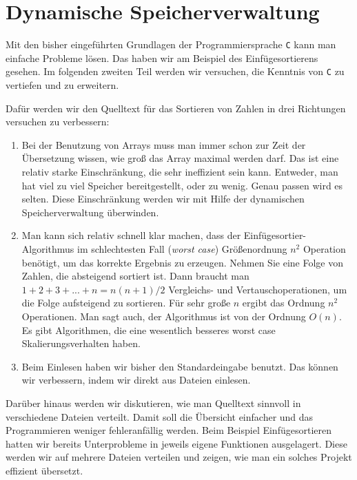 \section{Dynamische Speicherverwaltung}

Mit den bisher eingeführten Grundlagen der Programmiersprache \texttt{C} kann man einfache Probleme lösen.
Das haben wir am Beispiel des Einfügesortierens gesehen.
Im folgenden zweiten Teil werden wir versuchen, die Kenntnis von \texttt{C} zu vertiefen und zu erweitern.

Dafür werden wir den Quelltext für das Sortieren von Zahlen in drei Richtungen versuchen zu verbessern:
\begin{enumerate}
\item Bei der Benutzung von Arrays muss man immer schon zur Zeit der Übersetzung wissen, wie groß das Array maximal werden darf.
  Das ist eine relativ starke Einschränkung, die sehr ineffizient sein kann.
  Entweder, man hat viel zu viel Speicher bereitgestellt, oder zu wenig.
  Genau passen wird es selten.
  Diese Einschränkung werden wir mit Hilfe der dynamischen Speicherverwaltung überwinden.

\item Man kann sich relativ schnell klar machen, dass der Einfügesortier-Algorithmus im schlechtesten Fall (\emph{worst case}) Größenordnung $n^2$ Operation benötigt, um das korrekte Ergebnis zu erzeugen.
  Nehmen Sie eine Folge von Zahlen, die absteigend sortiert ist.
  Dann braucht man $1 + 2 + 3 + ... + n = n(n+1)/2$ Vergleichs- und Vertauschoperationen, um die Folge aufsteigend zu sortieren.
  Für sehr große $n$ ergibt das Ordnung $n^2$ Operationen.
  Man sagt auch, der Algorithmus ist von der Ordnung $O(n)$.
  Es gibt Algorithmen, die eine wesentlich besseres worst case Skalierungsverhalten haben. 

\item Beim Einlesen haben wir bisher den Standardeingabe benutzt.
  Das können wir verbessern, indem wir direkt aus Dateien einlesen.
\end{enumerate}
Darüber hinaus werden wir diskutieren, wie man Quelltext sinnvoll in verschiedene Dateien verteilt.
Damit soll die Übersicht einfacher und das Programmieren weniger fehleranfällig werden.
Beim Beispiel Einfügesortieren hatten wir bereits Unterprobleme in jeweils eigene Funktionen ausgelagert.
Diese werden wir auf mehrere Dateien verteilen und zeigen, wie man ein solches Projekt effizient übersetzt.

